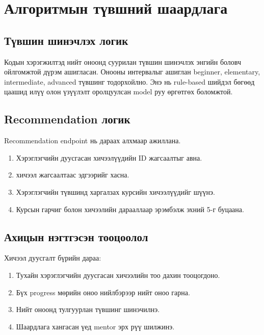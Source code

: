 \section{Алгоритмын түвшний шаардлага}
\subsection{Түвшин шинэчлэх логик}
Кодын хэрэгжилтэд нийт оноонд суурилан түвшин шинэчлэх энгийн боловч ойлгомжтой дүрэм ашигласан. Онооны интервалыг ашиглан beginner, elementary, intermediate, advanced түвшинг тодорхойлно. Энэ нь rule-based шийдэл бөгөөд цаашид илүү олон үзүүлэлт оролцуулсан model руу өргөтгөх боломжтой.

\subsection{Recommendation логик}
Recommendation endpoint нь дараах алхмаар ажиллана.
\begin{enumerate}
\item Хэрэглэгчийн дуусгасан хичээлүүдийн ID жагсаалтыг авна.
\item хичээл жагсаалтаас эдгээрийг хасна.
\item Хэрэглэгчийн түвшинд харгалзах курсийн хичээлүүдийг шүүнэ.
\item Курсын гарчиг болон хичээлийн дарааллаар эрэмбэлж эхний 5-г буцаана.
\end{enumerate}

\subsection{Ахицын нэгтгэсэн тооцоолол}
Хичээл дуусгалт бүрийн дараа:
\begin{enumerate}
\item Тухайн хэрэглэгчийн дуусгасан хичээлийн тоо дахин тооцогдоно.
\item Бүх progress мөрийн оноо нийлбэрээр нийт оноо гарна.
\item Нийт оноонд тулгуурлан түвшинг шинэчилнэ.
\item Шаардлага хангасан үед mentor эрх рүү шилжинэ.
\end{enumerate}

